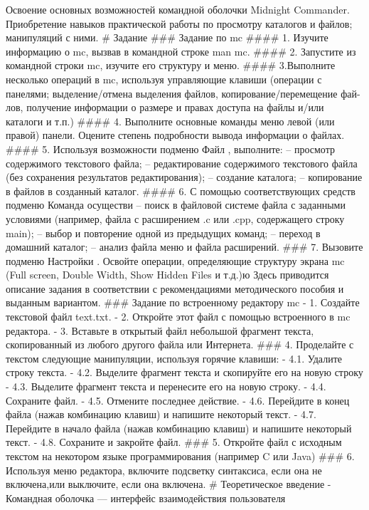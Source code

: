 \documentclass[
  english,
  russian,
  12pt,
  a4paper,
  DIV=11,
  numbers=noendperiod]{scrreprt}
\begin{document}
Освоение основных возможностей командной оболочки Midnight Commander.
Приобретение навыков практической работы по просмотру каталогов и
файлов; манипуляций с ними. \# Задание \#\#\# Задание по mc \#\#\#\# 1.
Изучите информацию о mc, вызвав в командной строке man mc. \#\#\#\# 2.
Запустите из командной строки mc, изучите его структуру и меню. \#\#\#\#
3.Выполните несколько операций в mc, используя управляющие клавиши
(операции с панелями; выделение/отмена выделения файлов,
копирование/перемещение фай- лов, получение информации о размере и
правах доступа на файлы и/или каталоги и т.п.) \#\#\#\# 4. Выполните
основные команды меню левой (или правой) панели. Оцените степень
подробности вывода информации о файлах. \#\#\#\# 5. Используя
возможности подменю Файл , выполните: -- просмотр содержимого текстового
файла; -- редактирование содержимого текстового файла (без сохранения
результатов редактирования); -- создание каталога; -- копирование в
файлов в созданный каталог. \#\#\#\# 6. С помощью соответствующих
средств подменю Команда осуществи -- поиск в файловой системе файла с
заданными условиями (например, файла с расширением .c или .cpp,
содержащего строку main); -- выбор и повторение одной из предыдущих
команд; -- переход в домашний каталог; -- анализ файла меню и файла
расширений. \#\#\# 7. Вызовите подменю Настройки . Освойте операции,
определяющие структуру экрана mc (Full screen, Double Width, Show Hidden
Files и т.д.)ю Здесь приводится описание задания в соответствии с
рекомендациями методического пособия и выданным вариантом. \#\#\#
Задание по встроенному редактору mc - 1. Создайте текстовой файл
text.txt. - 2. Откройте этот файл с помощью встроенного в mc редактора.
- 3. Вставьте в открытый файл небольшой фрагмент текста, скопированный
из любого другого файла или Интернета. \#\#\# 4. Проделайте с текстом
следующие манипуляции, используя горячие клавиши: - 4.1. Удалите строку
текста. - 4.2. Выделите фрагмент текста и скопируйте его на новую строку
- 4.3. Выделите фрагмент текста и перенесите его на новую строку. - 4.4.
Сохраните файл. - 4.5. Отмените последнее действие. - 4.6. Перейдите в
конец файла (нажав комбинацию клавиш) и напишите некоторый текст. - 4.7.
Перейдите в начало файла (нажав комбинацию клавиш) и напишите некоторый
текст. - 4.8. Сохраните и закройте файл. \#\#\# 5. Откройте файл с
исходным текстом на некотором языке программирования (например C или
Java) \#\#\# 6. Используя меню редактора, включите подсветку синтаксиса,
если она не включена,или выключите, если она включена. \# Теоретическое
введение - Командная оболочка --- интерфейс взаимодействия пользователя
\end{document}
